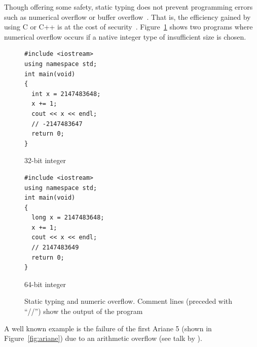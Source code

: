 \documentclass[12pt,a4paper,oneside,openright]{book}
\newcommand{\Ie}{That is, }
\newcommand{\fig}[1]{Figure~\ref{fig:#1}}
\newcommand{\cout}{Comment lines (preceded with ``//'') show the output of the program}
\begin{document}
\begin{CJK}{UTF8}{}
Though offering some safety, static typing does not prevent programming errors such as numerical overflow or buffer overflow~\citep{RefWorks:486}. \Ie the efficiency gained by using C or C++ is at the cost of security~\citep{wolczko}. \fig{staticnumber} shows two programs where numerical overflow occurs if a native integer type of insufficient size is chosen.
\begin{figure}[htbp]
  \lstset{language=C++,frame=single,numbers=none}
  \begin{center}
    \begin{minipage}[c]{.4\textwidth}
      \begin{center}
        \begin{lstlisting}
#include <iostream>
using namespace std;
int main(void)
{
  int x = 2147483648;
  x += 1;
  cout << x << endl;
  // -2147483647
  return 0;
}
        \end{lstlisting}
        32-bit integer
      \end{center}
    \end{minipage}\hspace{3ex}
    \begin{minipage}[c]{.4\textwidth}
      \begin{center}
        \begin{lstlisting}
#include <iostream>
using namespace std;
int main(void)
{
  long x = 2147483648;
  x += 1;
  cout << x << endl;
  // 2147483649
  return 0;
}
        \end{lstlisting}
        64-bit integer
      \end{center}
    \end{minipage}
  \end{center}
  \caption{Static typing and numeric overflow. \cout\label{fig:staticnumber}}
\end{figure}
A well known example is the failure of the first Ariane 5 (shown in \fig{ariane}) due to an arithmetic overflow (see talk by \citealp{fenwick2008}).
\begin{figure}[htbp]
   \begin{center}
     \\

\end{center}
\end{figure}
\end{CJK}
\end{document}
